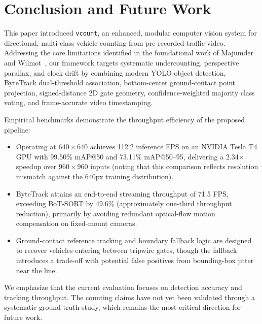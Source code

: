 \section{Conclusion and Future Work}
\label{sec:conclusion}

This paper introduced \texttt{vcount}, an enhanced, modular computer vision system for directional, multi-class vehicle counting from pre-recorded traffic video. Addressing the core limitations identified in the foundational work of Majumder and Wilmot~\cite{majumder2023automated}, our framework targets systematic undercounting, perspective parallax, and clock drift by combining modern YOLO object detection, ByteTrack dual-threshold association, bottom-center ground-contact point projection, signed-distance 2D gate geometry, confidence-weighted majority class voting, and frame-accurate video timestamping.

Empirical benchmarks demonstrate the throughput efficiency of the proposed pipeline:
\begin{itemize}
    \item Operating at $640\times 640$ achieves 112.2 inference FPS on an NVIDIA Tesla T4 GPU with 99.50\% mAP@50 and 73.11\% mAP@50--95, delivering a 2.34$\times$ speedup over $960\times 960$ inputs (noting that this comparison reflects resolution mismatch against the 640px training distribution).
    \item ByteTrack attains an end-to-end streaming throughput of 71.5 FPS, exceeding BoT-SORT by 49.6\% (approximately one-third throughput reduction), primarily by avoiding redundant optical-flow motion compensation on fixed-mount cameras.
    \item Ground-contact reference tracking and boundary fallback logic are designed to recover vehicles entering between tripwire gates, though the fallback introduces a trade-off with potential false positives from bounding-box jitter near the line.
\end{itemize}

We emphasize that the current evaluation focuses on detection accuracy and tracking throughput. The counting claims have not yet been validated through a systematic ground-truth study, which remains the most critical direction for future work.

